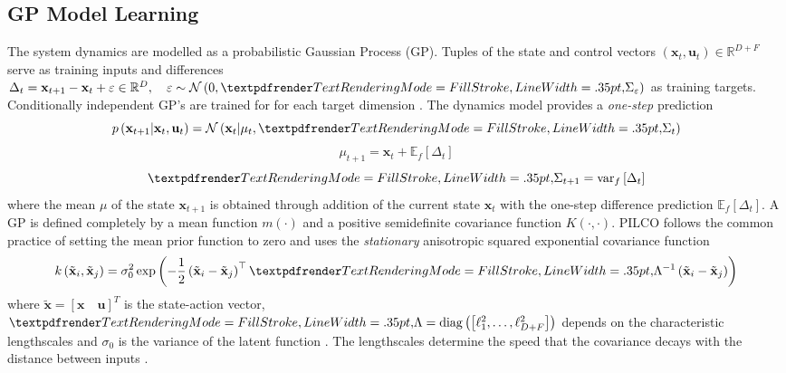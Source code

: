 \subsection{GP Model Learning}
\label{PILCO:GP-model-learning}
The system dynamics are modelled as a probabilistic Gaussian Process (GP). Tuples of the state and control vectors $\left(\mathbf{x}_{t}, \mathbf{u}_{t}\right)\in \mathbb{R}^{D+F}$ serve as training inputs and differences $\Delta_{t}=\mathbf{x}_{t+1}-\mathbf{x}_{t}+\varepsilon \in \mathbb{R}^{D},\quad \varepsilon \sim \mathcal{N}\left(0, \boldgreek{\Sigma}_{\varepsilon}\right)$ as training targets. Conditionally independent GP's are trained for for each target dimension \cite{deisenroth2010efficient}. The dynamics model provides a \textit{one-step} prediction \cite{deisenroth2011pilco}
\begin{equation}
    p\left(\mathbf{x}_{t+1} | \mathbf{x}_{t}, \mathbf{u}_{t}\right)=\mathcal{N}\left(\mathbf{x}_{t} | \mu_{t}, \boldgreek{\Sigma}_{t}\right)
    \label{Eq:PILCO-one-step-1}
\end{equation}
\begin{equation}
    \mu_{t+1}=\mathbf{x}_{t}+\mathbb{E}_{f}\left[\Delta_{t}\right]
    \label{Eq:PILCO-one-step-2}
\end{equation}
\begin{equation}
    \boldgreek{\Sigma}_{t+1}=\operatorname{var}_{f}\left[\Delta_{t}\right]
    \label{Eq:PILCO-one-step-3}
\end{equation}
where the mean $\mu$ of the state $\mathbf{x}_{t+1}$ is obtained through addition of the current state $\mathbf{x}_{t}$ with the one-step difference prediction $\mathbb{E}_{f}\left[\Delta_{t}\right]$. A GP is defined completely by a mean function $m(\cdot)$ and a positive semidefinite covariance function $K(\cdot,\cdot)$. PILCO follows the common practice of setting the mean prior function to zero and uses the \textit{stationary} anisotropic squared exponential covariance function
\begin{equation}
    k\left(\tilde{\mathbf{x}}_{i}, \tilde{\mathbf{x}}_{j}\right)=\sigma_{0}^{2} \exp \left(-\frac{1}{2}\left(\tilde{\mathbf{x}}_{i}-\tilde{\mathbf{x}}_{j}\right)^{\top} \boldgreek{\Lambda}^{-1}\left(\tilde{\mathbf{x}}_{i}-\tilde{\mathbf{x}}_{j}\right)\right)
    \label{Eq:PILCO-sq-exponential-covariance}
\end{equation}
where $\tilde{\mathbf{x}} = \left[\mathbf{x}\quad\mathbf{u}\right]^{T}$ is the state-action vector, $\boldgreek{\Lambda} =\operatorname{diag}\left(\left[\ell_{1}^{2}, \ldots, \ell_{D+F}^{2}\right]\right)$ depends on the characteristic lengthscales and $\sigma_{0}$ is the variance of the latent function \cite{deisenroth2013gaussian}. The lengthscales determine the speed that the covariance decays with the distance between inputs \cite{quia2010sparse}.

